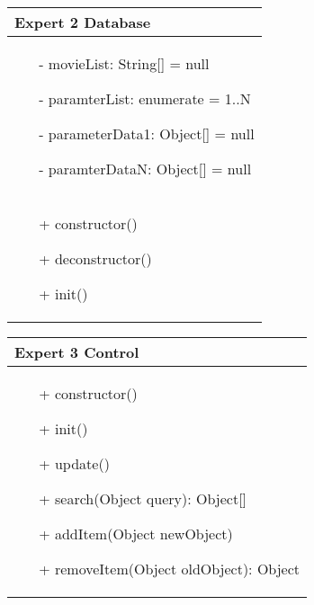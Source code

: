 \documentclass[]{article}
\begin{document}
\begin{table}[H]
\centering
\begin{tabular}{|>{\centering\arraybackslash}p{10cm}|}
\hline
Expert 2 Database\\
\hline
\begin{itemize}
\item[-] movieList: String[] = null
\item[-] paramterList: enumerate = 1..N
\item[-] parameterData1: Object[] = null
\item[-] paramterDataN: Object[] = null
\end{itemize}
\\
\hline
\begin{itemize}
\item[+] constructor()
\item[+] deconstructor()
\item[+] init()
\end{itemize}
\\
\hline
\end{tabular}
\end{table}
%
\begin{table}[H]
\centering
\begin{tabular}{|>{\centering\arraybackslash}p{10cm}|}
\hline
Expert 3 Control\\
\hline
\begin{itemize}
\item[+] constructor()
\item[+] init()
\item[+] update()
\item[+] search(Object query): Object[]
\item[+] addItem(Object newObject)
\item[+] removeItem(Object oldObject): Object
\end{itemize}
\\
\hline
\end{tabular}
\end{table}
%
\end{document}
